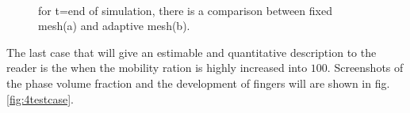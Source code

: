 \documentclass[preprint,authoryear,12pt]{elsarticle}
\begin{document}
\begin{figure}
\centering
{}\\[2mm]%
%
\caption{for t=end of simulation, there is a comparison between fixed mesh(a) and adaptive mesh(b).}
\label{fig:3testcase_d}
\end{figure}


The last case that will give an estimable and quantitative description to the reader is the when the mobility ration is highly increased into $100$. Screenshots of the phase volume fraction and the development of fingers will are shown in fig.\ref{fig:4testcase}.
\end{document}
